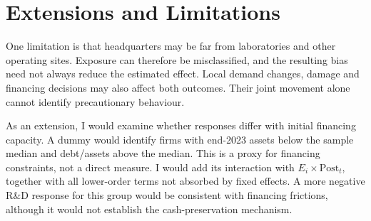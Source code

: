 \section*{Extensions and Limitations}

One limitation is that headquarters may be far from laboratories and other operating sites. Exposure can therefore be misclassified, and the resulting bias need not always reduce the estimated effect. Local demand changes, damage and financing decisions may also affect both outcomes. Their joint movement alone cannot identify precautionary behaviour.

As an extension, I would examine whether responses differ with initial financing capacity. A dummy would identify firms with end-2023 assets below the sample median and debt/assets above the median. This is a proxy for financing constraints, not a direct measure. I would add its interaction with $E_i \times \mathrm{Post}_t$, together with all lower-order terms not absorbed by fixed effects. A more negative R\&D response for this group would be consistent with financing frictions, although it would not establish the cash-preservation mechanism.
